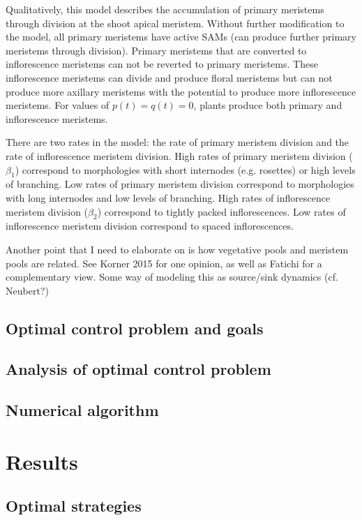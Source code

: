 \documentclass[12pt, oneside,titlepage]{article}   	%
\begin{document}
Qualitatively, this model describes the accumulation of primary meristems through division at the shoot apical meristem. Without further modification to the model, all primary meristems have active SAMs (can produce further primary meristems through division). Primary meristems that are converted to inflorescence meristems can not be reverted to primary meristems. These inflorescence meristems can divide and produce floral meristems but can not produce more axillary meristems with the potential to produce more inflorescence meristems. For values of $p(t)=q(t)=0$, plants produce both primary and inflorescence meristems. 

There are two rates in the model: the rate of primary meristem division and the rate of inflorescence meristem division. High rates of primary meristem division ($\beta_1$) correspond to morphologies with short internodes (e.g. rosettes) or high levels of branching. Low rates of primary meristem division correspond to morphologies with long internodes and low levels of branching. High rates of inflorescence meristem division ($\beta_2$) correspond to tightly packed inflorescences. Low rates of inflorescence meristem division correspond to spaced inflorescences.

Another point that I need to elaborate on is how vegetative pools and meristem pools are related. See Korner 2015 for one opinion, as well as Fatichi for a complementary view. Some way of modeling this as source/sink dynamics (cf. Neubert?)

\subsection{Optimal control problem and goals}


\subsection{Analysis of optimal control problem}

\subsection{Numerical algorithm}


\clearpage
\newpage

\section{Results}

\subsection{Optimal strategies}
\end{document}
